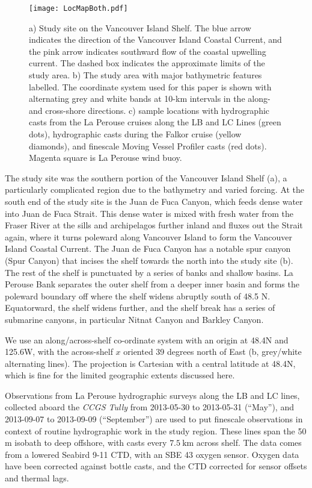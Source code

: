 \documentclass[draft]{agujournal2019}
\begin{document}
\begin{figure}[htbp]
  \texttt{[image: LocMapBoth.pdf]}
  \caption{a) Study site on the Vancouver Island Shelf.  The blue arrow indicates the direction of the Vancouver Island Coastal Current, and the pink arrow indicates southward flow of the coastal upwelling current.  The dashed box indicates the approximate limits of the study area.  b) The study area with major bathymetric features labelled.  The coordinate system used for this paper is shown with alternating grey and white bands at 10-km intervals in the along- and cross-shore directions. c) sample locations with hydrographic casts from the La Perouse cruises along the LB and LC Lines (green dots), hydrographic casts during the Falkor cruise (yellow diamonds), and finescale Moving Vessel Profiler casts (red dots).  Magenta
  square is La Perouse wind buoy.}
  \label{fig:LocMapBoth}
\end{figure}

The study site was the southern portion of the Vancouver Island Shelf (a), a particularly complicated region due to the bathymetry and varied forcing.  At the south end of the study site is the Juan de Fuca Canyon, which feeds dense water into Juan de Fuca Strait.  This dense water is mixed with fresh water from the Fraser River at the sills and archipelagos further inland and fluxes out the Strait again, where it turns poleward along Vancouver Island to form the Vancouver Island Coastal Current.  The Juan de Fuca Canyon has a notable spur canyon (Spur Canyon) that incises the shelf towards the north into the study site (b).  The rest of the shelf is punctuated by a series of banks and shallow basins.  La Perouse Bank  separates the outer shelf from a deeper inner basin and forms the poleward boundary off where the shelf widens abruptly south of 48.5 N. Equatorward, the shelf widens further, and the shelf break has a series of submarine canyons, in particular Nitnat Canyon and Barkley Canyon.

We use an along/across-shelf co-ordinate system with an origin at
48.4\textdegree N and 125.6\textdegree W, with the across-shelf $x$ oriented 39 degrees north of East (b, grey/white alternating lines).  The projection is Cartesian with a central latitude at 48.4\textdegree N, which is fine for the limited geographic extents discussed here.

Observations from La Perouse hydrographic surveys along the LB and LC lines, collected aboard the \emph{CCGS Tully} from 2013-05-30 to 2013-05-31  (``May''), and 2013-09-07 to 2013-09-09 (``September'') are used to put finescale observations in context of routine hydrographic work in the study region.  These lines span the 50 m isobath to deep offshore, with casts every $7.5\ \mathrm{km}$ across shelf. The data comes from a lowered Seabird 9-11 CTD, with an SBE 43 oxygen sensor.  Oxygen data have been corrected against bottle casts, and the CTD corrected for sensor offsets and thermal lags.
\end{document}
